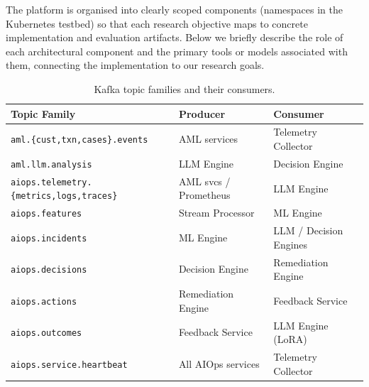 \documentclass[a4paper]{lipics-v2021}
\begin{document}
The platform is organised into clearly scoped components (namespaces in the
Kubernetes testbed) so that each research objective maps to concrete
implementation and evaluation artifacts. Below we briefly describe the role of
each architectural component and the primary tools or models associated with
them, connecting the implementation to our research goals.
\begin{table}[t]
\caption{Kafka topic families and their consumers.}
\label{tab:topics}
\small
\begin{tabular}{>{\raggedright\arraybackslash}p{5.3cm}
                >{\raggedright\arraybackslash}p{3.0cm}
                >{\raggedright\arraybackslash}p{3.0cm}}
\toprule
\textbf{Topic Family} & \textbf{Producer} & \textbf{Consumer}\\
\midrule
\texttt{aml.\{cust,\allowbreak txn,\allowbreak cases\}.events} & AML services & Telemetry Collector\\
\texttt{aml.llm.analysis}                     & LLM Engine        & Decision Engine\\
\texttt{aiops.telemetry.\allowbreak\{metrics,logs,traces\}} & AML svcs / Prometheus & LLM Engine\\
\texttt{aiops.features}                       & Stream Processor  & ML Engine\\
\texttt{aiops.incidents}                      & ML Engine         & LLM / Decision Engines\\
\texttt{aiops.decisions}                      & Decision Engine   & Remediation Engine\\
\texttt{aiops.actions}                        & Remediation Engine & Feedback Service\\
\texttt{aiops.outcomes}                       & Feedback Service  & LLM Engine (LoRA)\\
\texttt{aiops.service.heartbeat}              & All AIOps services & Telemetry Collector\\
\bottomrule
\end{tabular}
\end{table}
\end{document}
